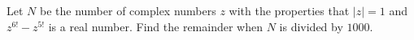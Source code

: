 Let $N$ be the number of complex numbers $z$ with the properties that $|z|=1$ and $z^{6!}-z^{5!}$ is a real number. Find the remainder when $N$ is divided by $1000$.